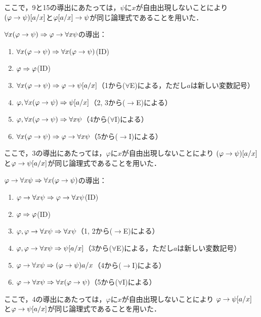 ここで，9と15の導出にあたっては，\(\psi\)に\(x\)が自由出現しないことにより
\(\subst{\paren{\varphi \to \psi}}{a/x}\)と\(\subst{\varphi}{a/x} \to \psi\)が同じ論理式であることを用いた．

\(\forall x \paren{\varphi \to \psi} \sequent \varphi \to \forall x \psi\)の導出：
\begin{enumerate}
	\item \(\forall x \paren{\varphi \to \psi} \sequent \forall x \paren{\varphi \to \psi}\)\quad (ID)
	\item \(\varphi \Rightarrow \varphi\)\quad (ID)
	\item \(\forall x \paren{\varphi \to \psi} \sequent \varphi \to \subst{\psi}{a/x}\)\quad （1から(\(\forall\)E)による，ただし\(a\)は新しい変数記号）
	\item \(\varphi, \forall x \paren{\varphi \to \psi} \sequent \subst{\psi}{a/x}\)\quad （2, 3から(\(\to\)E)による）
	\item \(\varphi, \forall x \paren{\varphi \to \psi} \sequent \forall x \psi\)\quad （4から(\(\forall\)I)による）
	\item \(\forall x \paren{\varphi \to \psi} \sequent \varphi \to \forall x \psi\)\quad （5から(\(\to\)I)による）
\end{enumerate}
ここで，3の導出にあたっては，\(\varphi\)に\(x\)が自由出現しないことにより
\(\subst{\paren{\varphi \to \psi}}{a/x}\)と\(\varphi \to \subst{\psi}{a/x}\)が同じ論理式であることを用いた．

\(\varphi \to \forall x \psi \sequent \forall x \paren{\varphi \to \psi}\)の導出：
\begin{enumerate}
	\item \(\varphi \to \forall x \psi \Rightarrow \varphi \to \forall x \psi\)\quad (ID)
	\item \(\varphi \Rightarrow \varphi\)\quad (ID)
	\item \(\varphi, \varphi \to \forall x \psi \Rightarrow \forall x \psi\)\quad （1, 2から(\(\to\)E)による）
	\item \(\varphi, \varphi \to \forall x \psi \sequent \subst{\psi}{a/x}\)\quad （3から(\(\forall\)E)による，ただし\(a\)は新しい変数記号）
	\item \(\varphi \to \forall x \psi \sequent \paren{\varphi \to \psi}{a/x}\)\quad （4から(\(\to\)I)による）
	\item \(\varphi \to \forall x \psi \sequent \forall x \paren{\varphi \to \psi}\)\quad （5から(\(\forall\)I)による）
\end{enumerate}
ここで，4の導出にあたっては，\(\varphi\)に\(x\)が自由出現しないことにより
\(\varphi \to \subst{\psi}{a/x}\)と\(\subst{\varphi \to \psi}{a/x}\)が同じ論理式であることを用いた．

